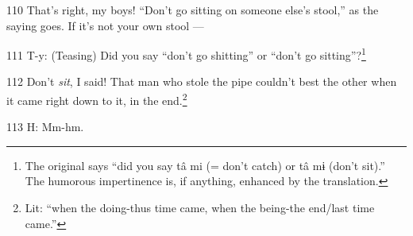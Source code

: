110 That's right, my boys! ``Don't go sitting on someone else's stool,'' as the
saying goes. If it's not your own stool ---

111 T-y: (Teasing) Did you say ``don't go shitting'' or ``don't go sitting''?\footnote{The original says ``did you say tâ mi (= don't catch) or tâ mɨ (don't sit).'' The humorous impertinence is, if anything, enhanced by the translation.}

112 Don't \textit{sit}, I said! That man who stole the pipe couldn't best the other
when it came right down to it, in the end.\footnote{Lit: ``when the doing-thus time came, when the being-the end/last time came.''}

113 H: Mm-hm.

